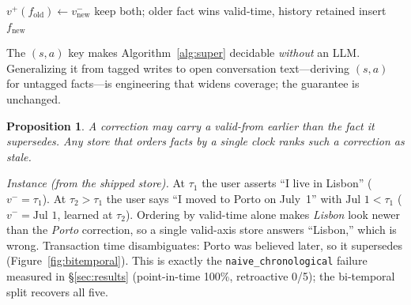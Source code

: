 \documentclass[11pt]{article}
\newtheorem{proposition}{Proposition}
\newcommand{\code}[1]{\texttt{#1}}
\begin{document}
\begin{algorithm}[t]
\caption{Deterministic supersession on write (no LLM)}\label{alg:super}
\begin{algorithmic}[1]
\Procedure{Add}{$f_{\text{new}} = \langle s,a,v_{\text{new}},[v^-_{\text{new}},\infty),[\text{now},\infty)\rangle$}
      \State $v^+(f_{\text{old}}) \gets v^-_{\text{new}}$ 
    \Else
      \State keep both; older fact wins valid-time, history retained
    \EndIf
  \EndFor
  \State insert $f_{\text{new}}$
\EndProcedure
\end{algorithmic}
\end{algorithm}

The $(s,a)$ key makes Algorithm~\ref{alg:super} decidable \emph{without} an LLM. Generalizing it
from tagged writes to open conversation text---deriving $(s,a)$ for untagged facts---is engineering
that widens coverage; the guarantee is unchanged.

\begin{proposition}\label{prop:retro}
A correction may carry a valid-from \emph{earlier} than the fact it supersedes. Any store that
orders facts by a single clock ranks such a correction as stale.
\end{proposition}

\emph{Instance (from the shipped store).} At $\tau_1$ the user asserts ``I live in Lisbon''
($v^-=\tau_1$). At $\tau_2 > \tau_1$ the user says ``I moved to Porto on July~1'' with
$\text{Jul 1} < \tau_1$ ($v^-=\text{Jul 1}$, learned at $\tau_2$). Ordering by valid-time alone
makes \emph{Lisbon} look newer than the \emph{Porto} correction, so a single valid-axis store
answers ``Lisbon,'' which is wrong. Transaction time disambiguates: Porto was believed later, so it
supersedes (Figure~\ref{fig:bitemporal}). This is exactly the \code{naive\_chronological} failure
measured in \S\ref{sec:results} (point-in-time 100\%, retroactive 0/5); the bi-temporal split
recovers all five.
\end{document}
